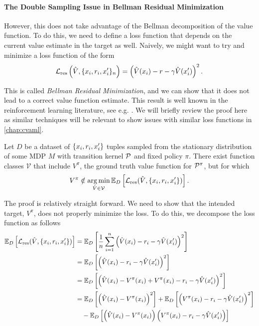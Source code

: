 \paragraph{The Double Sampling Issue in Bellman Residual Minimization}
However, this does not take advantage of the Bellman decomposition of the value function.
To do this, we need to define a loss function that depends on the current value estimate in the target as well.
Naively, we might want to try and minimize a loss function of the form
$$\mathcal{L}_\mathrm{res}\left(\hat{V}, \{\state_i, r_i, \state'_i\}_{n}\right) = \left(\hat{V}(\state_i) - r - \gamma \hat{V}(\state'_i)\right)^2.$$

This is called \emph{Bellman Residual Minimization}, and we can show that it does not lead to a correct value function estimate.
This result is well known in the reinforcement learning literature, see e.g. \textcite[p. 299]{suttonbook}.
We will briefly review the proof here as similar techniques will be relevant to show issues with similar loss functions in \autoref{chap:cvaml}.


\begin{proposition}
    Let $D$ be a dataset of $\{\state_i,r_i,\state'_i\}$ tuples sampled from the stationary distribution of some MDP $M$ with transition kernel $\P$ and fixed policy $\pi$.
    There exist function classes $\mathcal{V}$ that include $V^\pi$, the ground truth value function for $\P^\pi$, but for which 
    \[V^\pi \notin \argmin_{\hat{V} \in \mathcal{V}} \mathbb{E}_{D} \left[\mathcal{L}_\mathrm{res}(\hat{V}, \{\state_i, r_i, \state'_i\})\right].\]
\end{proposition}

The proof is relatively straight forward.
We need to show that the intended target, $V^\pi$, does not properly minimize the loss.
To do this, we decompose the loss function as follows
\begin{align}
    \mathbb{E}_{D} \left[\mathcal{L}_\mathrm{res}(\hat{V}, \{\state_i, r_i, \state'_i\})\right] &= \mathbb{E}_{D} \left[\frac{1}{n} \sum_{i=1}^n \left(\hat{V}(\state_i) - r_i - \gamma \hat{V}(\state'_i)\right)^2\right] \\
    &=\mathbb{E}_{D} \left[\left(\hat{V}(x_i) - r_i - \gamma \hat{V}(x'_i)\right)^2\right] \\
    &=\mathbb{E}_{D} \left[\left(\hat{V}(x_i) - V^\pi(x_i) + V^\pi(x_i) - r_i - \gamma \hat{V}(x'_i)\right)^2\right] \\
    &=\mathbb{E}_{D} \left[\left(\hat{V}(x_i) - V^\pi(x_i)\right)^2\right] + \mathbb{E}_{D}\left[\left( V^\pi(x_i) - r_i - \gamma \hat{V}(x'_i)\right)^2\right] \\
    &\quad - \mathbb{E}_{D}\left[\left(\hat{V}(x_i) - V^\pi(x_i)\right)\left( V^\pi(x_i) - r_i - \gamma \hat{V}(x'_i)\right)\right]\\
\end{align}

